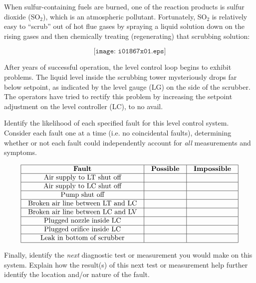 

When sulfur-containing fuels are burned, one of the reaction products is sulfur dioxide (SO$_{2}$), which is an atmospheric pollutant.  Fortunately, SO$_{2}$ is relatively easy to ``scrub'' out of hot flue gases by spraying a liquid solution down on the rising gases and then chemically treating (regenerating) that scrubbing solution:

$$\texttt{[image: i01867x01.eps]}$$

After years of successful operation, the level control loop begins to exhibit problems.  The liquid level inside the scrubbing tower mysteriously drops far below setpoint, as indicated by the level gauge (LG) on the side of the scrubber.  The operators have tried to rectify this problem by increasing the setpoint adjustment on the level controller (LC), to no avail.

Identify the likelihood of each specified fault for this level control system.  Consider each fault one at a time (i.e. no coincidental faults), determining whether or not each fault could independently account for {\it all} measurements and symptoms.


$$\vbox{\offinterlineskip
\halign{\strut
\vrule \quad\hfil # \ \hfil & 
\vrule \quad\hfil # \ \hfil & 
\vrule \quad\hfil # \ \hfil \vrule \cr
\noalign{\hrule}
%
{\bf Fault} & {\bf Possible} & {\bf Impossible} \cr
%
\noalign{\hrule}
%
Air supply to LT shut off &  &  \cr
%
\noalign{\hrule}
%
Air supply to LC shut off &  &  \cr
%
\noalign{\hrule}
%
Pump shut off &  &  \cr
%
\noalign{\hrule}
%
Broken air line between LT and LC &  &  \cr
%
\noalign{\hrule}
%
Broken air line between LC and LV &  &  \cr
%
\noalign{\hrule}
%
Plugged nozzle inside LC &  &  \cr
%
\noalign{\hrule}
%
Plugged orifice inside LC &  &  \cr
%
\noalign{\hrule}
%
Leak in bottom of scrubber &  &  \cr
%
\noalign{\hrule}
} %
}$$ %

Finally, identify the {\it next} diagnostic test or measurement you would make on this system.  Explain how the result(s) of this next test or measurement help further identify the location and/or nature of the fault.

